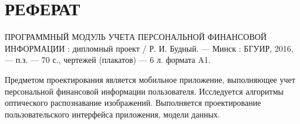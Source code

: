 \section*{РЕФЕРАТ}
\thispagestyle{empty}

ПРОГРАММНЫЙ МОДУЛЬ УЧЕТА ПЕРСОНАЛЬНОЙ ФИНАНСОВОЙ ИНФОРМАЦИИ :
дипломный проект / Р. И. Будный. --- Минск : БГУИР, 2016, --- п.з. ---
{\color{red} 70 с.}, чертежей (плакатов) --- 6 л. формата A1.

Предметом проектирования является мобильное приложение,
выполняющее учет персональной финансовой информации пользователя.
Исследуется алгоритмы оптического распознавание изображений.
Выполняется проектирование пользовательского интерфейса приложения,
модели данных.







\pagebreak

